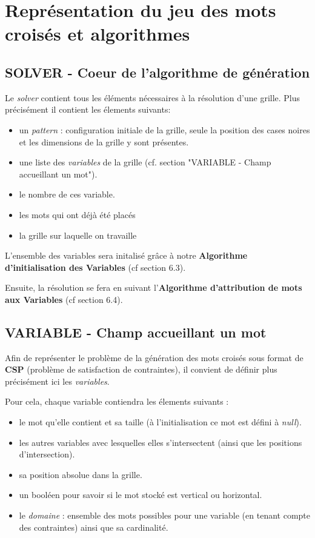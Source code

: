 \documentclass [ 11 pt ] {article}
\begin{document}
\newpage
\section{Représentation du jeu des mots croisés et algorithmes}
    \subsection{SOLVER - Coeur de l'algorithme de génération}

    Le \textit{solver} contient tous les éléments nécessaires à la résolution d'une grille. Plus précisément il contient les élements suivants:

    \begin{itemize}
        \item un \textit{pattern} : configuration initiale de la grille, seule la position des cases noires et les dimensions de la grille y sont présentes.
        \item une liste des \textit{variables} de la grille (cf. section "VARIABLE - Champ accueillant un mot"). 
        \item le nombre de ces variable.
        \item les mots qui ont déjà été placés
        \item la grille sur laquelle on travaille
    \end{itemize}
    
    L'ensemble des variables sera initalisé grâce à notre \textbf{Algorithme d'initialisation des Variables} (cf section 6.3).
        
    Ensuite, la résolution se fera en suivant l'\textbf{Algorithme d'attribution de mots aux Variables} (cf section 6.4).
    
    \subsection{VARIABLE - Champ accueillant un mot}
    
    Afin de représenter le problème de la génération des mots croisés sous format de \textbf{CSP} (problème de satisfaction de contraintes), il convient de définir plus précisément ici les \textit{variables}.
    
    Pour cela, chaque variable contiendra les élements suivants : 
    \begin{itemize}
        \item le mot qu'elle contient et sa taille (à l'initialisation ce mot est défini à \textit{null}).
        \item les autres variables avec lesquelles elles s'intersectent (ainsi que les positions d'intersection).
        \item sa position absolue dans la grille.
        \item un booléen pour savoir si le mot stocké est vertical ou horizontal.
        \item le \textit{domaine} :  ensemble des mots possibles pour une variable (en tenant compte des contraintes) ainsi que sa cardinalité.
    \end{itemize}
    
\end{document}
